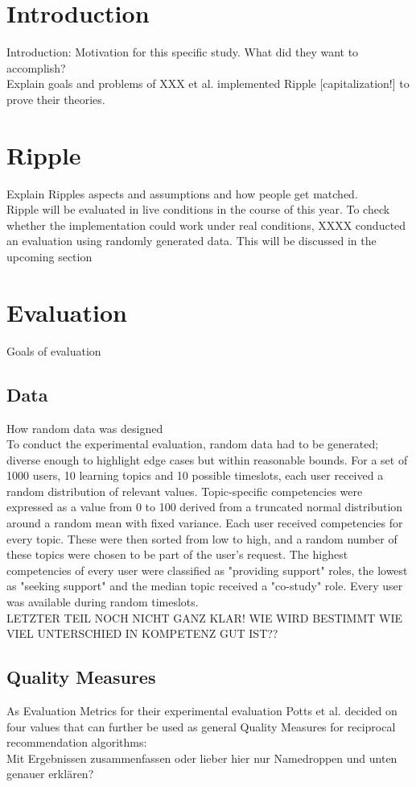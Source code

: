 \documentclass[nochapterpage,bigchapter,linedtoc,longdoc,colorback,accentcolor=tud3b]{tudreport}
\begin{document}
\section{Introduction}
Introduction: Motivation for this specific study. What did they want to accomplish?\\
Explain goals and problems of 
XXX et al. implemented Ripple [capitalization!] to prove their theories. 
\section{Ripple}
Explain Ripples aspects and assumptions and how people get matched.\\
Ripple will be evaluated in live conditions in the course of this year. To check whether the implementation could work under real conditions, XXXX conducted an evaluation using randomly generated data. This will be discussed in the upcoming section\\
\section{Evaluation}
Goals of evaluation\\
\subsection{Data}
How random data was designed\\
To conduct the experimental evaluation, random data had to be generated; diverse enough to highlight edge cases but within reasonable bounds. For a set of 1000 users, 10 learning topics and 10 possible timeslots, each user received a random distribution of relevant values. Topic-specific competencies were expressed as a value from 0 to 100 derived from a truncated normal distribution around a random mean with fixed variance. Each user received competencies for every topic. These were then sorted from low to high, and a random number of these topics were chosen to be part of the user's request. The highest competencies of every user were classified as "providing support" roles, the lowest as "seeking support" and the median topic received a "co-study" role. Every user was available during random timeslots.\\
LETZTER TEIL NOCH NICHT GANZ KLAR! WIE WIRD BESTIMMT WIE VIEL UNTERSCHIED IN KOMPETENZ GUT IST??\\

\subsection{Quality Measures}
As Evaluation Metrics for their experimental evaluation Potts et al. decided on four values that can further be used as general Quality Measures for reciprocal recommendation algorithms:\\
Mit Ergebnissen zusammenfassen oder lieber hier nur Namedroppen und unten genauer erklären?\\	
\end{document}
